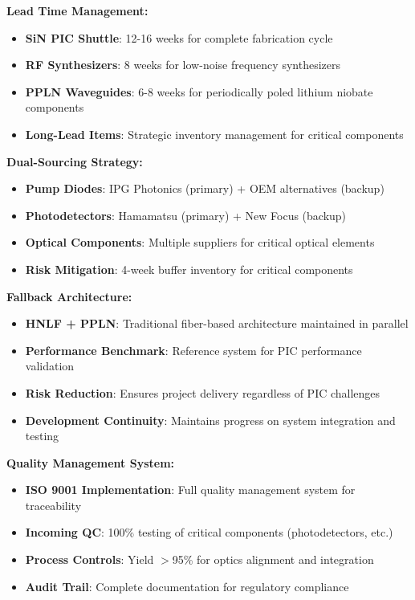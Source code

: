 \documentclass[11pt,a4paper]{article}
\begin{document}
\textbf{Lead Time Management:}
\begin{itemize}
\item \textbf{SiN PIC Shuttle}: 12-16 weeks for complete fabrication cycle
\item \textbf{RF Synthesizers}: 8 weeks for low-noise frequency synthesizers
\item \textbf{PPLN Waveguides}: 6-8 weeks for periodically poled lithium niobate components
\item \textbf{Long-Lead Items}: Strategic inventory management for critical components
\end{itemize}

\textbf{Dual-Sourcing Strategy:}
\begin{itemize}
\item \textbf{Pump Diodes}: IPG Photonics (primary) + OEM alternatives (backup)
\item \textbf{Photodetectors}: Hamamatsu (primary) + New Focus (backup)
\item \textbf{Optical Components}: Multiple suppliers for critical optical elements
\item \textbf{Risk Mitigation}: 4-week buffer inventory for critical components
\end{itemize}

\textbf{Fallback Architecture:}
\begin{itemize}
\item \textbf{HNLF + PPLN}: Traditional fiber-based architecture maintained in parallel
\item \textbf{Performance Benchmark}: Reference system for PIC performance validation
\item \textbf{Risk Reduction}: Ensures project delivery regardless of PIC challenges
\item \textbf{Development Continuity}: Maintains progress on system integration and testing
\end{itemize}

\textbf{Quality Management System:}
\begin{itemize}
\item \textbf{ISO 9001 Implementation}: Full quality management system for traceability
\item \textbf{Incoming QC}: 100\% testing of critical components (photodetectors, etc.)
\item \textbf{Process Controls}: Yield $>$95\% for optics alignment and integration
\item \textbf{Audit Trail}: Complete documentation for regulatory compliance
\end{itemize}
\end{document}
